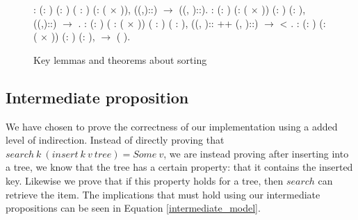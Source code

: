 \begin{figure}
  \begin{coqdoccode}
  \coqdocnoindent
    : \coqdockw{\ensuremath{\forall}} (: ) (: ) ( : ) (:  ( \ensuremath{\times} )),\coqdoceol
  \coqdocindent{1.00em}
   ((,)::) \ensuremath{\rightarrow} ((, )::).\coqdoceol
  \coqdocemptyline
  \coqdocnoindent
    : \coqdockw{\ensuremath{\forall}} (: ) (:  ( \ensuremath{\times} )) (: ) (: ),\coqdoceol
  \coqdocindent{1.00em}
   ((,)::) \ensuremath{\rightarrow}  .\coqdoceol
  \coqdocemptyline
  \coqdocnoindent
    : \coqdockw{\ensuremath{\forall}} (: ) ( :  ( \ensuremath{\times} )) ( : ) ( : ),\coqdoceol
  \coqdocindent{1.00em}
  ((, ):: ++ (, )::) \ensuremath{\rightarrow}  < .\coqdoceol
  \coqdocemptyline
  \coqdocnoindent
    : \coqdockw{\ensuremath{\forall}} (: ) (:  ( \ensuremath{\times} )) (: ) (: ),\coqdoceol
  \coqdocindent{1.00em}
    \ensuremath{\rightarrow}  (   ).\coqdoceol
  \coqdocemptyline
  \end{coqdoccode}
  \caption{Key lemmas and theorems about sorting}
  \label{fig:key_sorting_lemmas}
\end{figure}

\subsection{Intermediate proposition}
\label{intermediate_prop}
We have chosen to prove the correctness of our implementation using a added level of indirection. Instead of directly proving that $search~k~(insert~k~v~ tree) = Some~v$, we are instead proving after inserting into a tree, we know that the tree has a certain property: that it contains the inserted key. Likewise we prove that if this property holds for a tree, then $search$ can retrieve the item. The implications that must hold using our intermediate propositions can be seen in Equation \ref{intermediate_model}.


